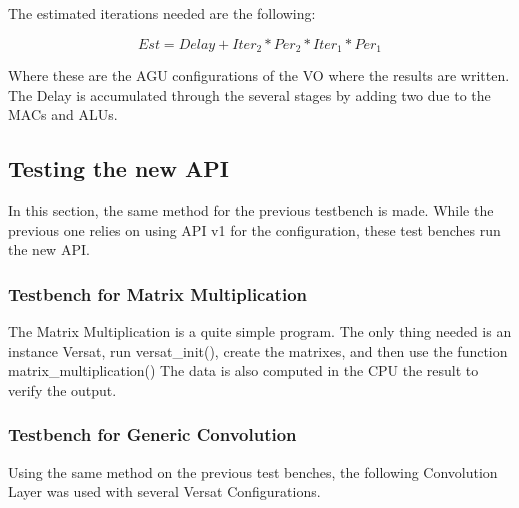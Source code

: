 \documentclass[conference]{IEEEtran}
\begin{document}

The estimated iterations needed are the following:

\[ Est=Delay+Iter_2*Per_2*Iter_1*Per_1\]

Where these are the AGU configurations of the VO where the results are written. The Delay is accumulated
through the several stages by adding two due to the MACs and ALUs.

\subsection{Testing the new API}
\label{section:testgencov}

In this section, the same method for the previous testbench is made. 
While the previous one relies on using API v1 for the configuration, these test benches
run the new API. 

\subsubsection{Testbench for Matrix Multiplication}

The Matrix Multiplication is a quite simple program. The only thing needed is an instance
Versat, run versat\_init(), create the matrixes, and then use the function matrix\_multiplication()
The data is also computed in the CPU the result to verify the output.


\subsubsection{Testbench for Generic Convolution}

Using the same method on the previous test benches, the following Convolution Layer was used
with several Versat Configurations.
\end{document}
